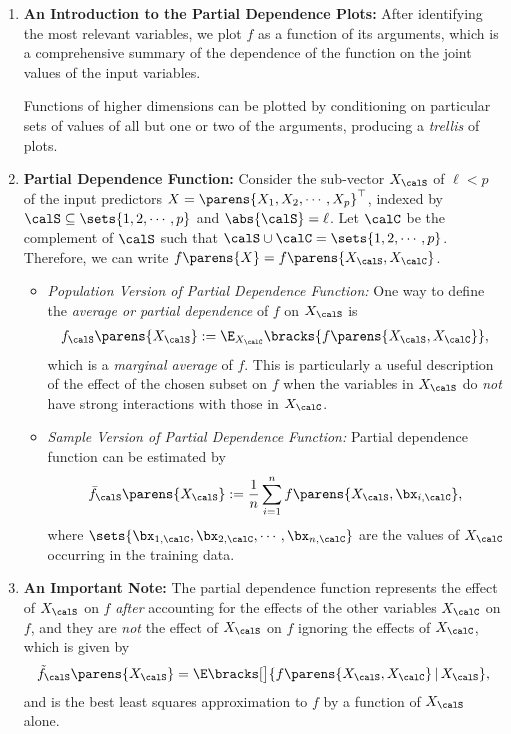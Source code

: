 \documentclass[12pt]{article}
\begin{document}
\begin{enumerate}[label=\textbf{\arabic*.}]

	\item \textbf{An Introduction to the Partial Dependence Plots:} After identifying the most relevant variables, we plot $f$ as a function of its arguments, which is a comprehensive summary of the dependence of the function on the joint values of the input variables. 
	
	Functions of higher dimensions can be plotted by conditioning on particular sets of values of all but one or two of the arguments, producing a \textit{trellis} of plots. 

	\item \textbf{Partial Dependence Function:} Consider the sub-vector $X_{\calS}$ of $\ell < p$ of the input predictors $X = \parens{X_1, X_2, \cdots, X_p}^\top$, indexed by $\calS \subseteq \sets{1, 2, \cdots, p}$ and $\abs{\calS} = \ell$. Let $\calC$ be the complement of $\calS$ such that $\calS \cup \calC = \sets{1, 2, \cdots, p}$. Therefore, we can write $f \parens{X} = f \parens{X_{\calS}, X_{\calC}}$. 
	\begin{itemize}
		\item \textit{Population Version of Partial Dependence Function:} One way to define the \textit{average or partial dependence} of $f$ on $X_{\calS}$ is
		\begin{align}
			f_{\calS} \parens{X_{\calS}} := \E_{X_{\calC}} \bracks{ f \parens{X_{\calS}, X_{\calC}}}, 
		\end{align}
		which is a \textit{marginal average} of $f$. This is particularly a useful description of the effect of the chosen subset on $f$ when the variables in $X_{\calS}$ do \emph{not} have strong interactions with those in $X_{\calC}$.  
		
		\item \textit{Sample Version of Partial Dependence Function:} Partial dependence function can be estimated by
		\begin{align}
			\bar{f}_{\calS} \parens{X_{\calS}} := \frac{1}{n} \sum_{i=1}^n f \parens{X_{\calS}, \bx_{i, \calC}}, 
		\end{align}
		where $\sets{\bx_{1,\calC}, \bx_{2,\calC}, \cdots, \bx_{n,\calC}}$ are the values of $X_{\calC}$ occurring in the training data. 

	\end{itemize}

	\item \textbf{An Important Note:} The partial dependence function represents the effect of $X_{\calS}$ on $f$ \emph{after} accounting for the effects of the other variables $X_{\calC}$ on $f$, and they are \textit{not} the effect of $X_{\calS}$ on $f$ ignoring the effects of $X_{\calC}$, which is given by 
	\begin{align*}
		\tilde{f}_{\calS} \parens{X_{\calS}} = \E \bracks[\big]{f \parens{X_{\calS}, X_{\calC}} \,\vert\, X_{\calS}}, 
	\end{align*}
	and is the best least squares approximation to $f$ by a function of $X_{\calS}$ alone. 
	

\end{enumerate}
\end{document}
